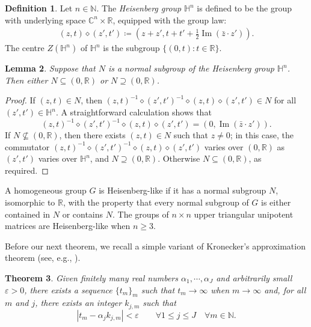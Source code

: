 \documentclass[12pt,twoside,a4paper]{amsart}
\newtheorem{thm}{Theorem}[section]
\newtheorem{lem}[thm]{Lemma}%
\theoremstyle{definition}
\newtheorem{defn}[thm]{Definition}%
\theoremstyle{remark}
\numberwithin{equation}{section}
\newcommand{\Hn}{\mathbb{H}^n}
\newcommand{\C}{\mathbb{C}}
\newcommand{\R}{\mathbb{R}}
\newcommand{\N}{\mathbb{N}}
\renewcommand{\Im}{\operatorname{Im}}
\newcommand{\lpar}{\left( }
\newcommand{\rpar}{\right) }
\newcommand{\labs}{\left\vert}
\newcommand{\rabs}{\right\vert}
\begin{document}
\begin{defn}
Let $n\in\mathbb{N}$. 
The \emph{Heisenberg group} $\Hn$ is defined to be the group with underlying space $\C^n\times\R$, equipped with the group law: 
\begin{align*}
(z,t)  \diamond  (z',t') \coloneqq  \lpar z+z', t + t' + \tfrac{1}{2} \Im(\bar z \cdot z') \rpar .
\end{align*}
The centre $Z(\Hn)$ of $\Hn$ is the subgroup $\{ (0,t) : t \in \R \}$.
\end{defn}



\begin{lem}\label{lem:kernel-homom-Heisenberg}  
Suppose that $N$ is a normal subgroup of the Heisenberg group $\Hn$.
Then either $N \subseteq (0, \R)$ or  $N \supseteq (0, \R)$.
\end{lem}

\begin{proof}
If $(z,t) \in N$, then $(z,t)^{-1} \diamond (z',t')^{-1} \diamond (z,t) \diamond (z',t') \in N$ for all $(z', t') \in \Hn$.
A straightforward calculation shows that
\[ 
(z,t)^{-1} \diamond(z',t')^{-1} \diamond  (z,t) \diamond (z' , t') = (0, \Im(\bar 
z \cdot z') ).
\]
If $N \not\subseteq (0, \R)$, then there exists $(z,t) \in N$ such that $z \neq 0$;
in this case, the commutator $(z,t)^{-1} \diamond(z',t')^{-1} \diamond  (z,t) \diamond (z',t') $ varies over $(0, \R)$ as $(z',t')$ varies over $\Hn$, and $N \supseteq (0, \R)$.
Otherwise  $N \subseteq (0, \R)$, as required.
\end{proof}

A homogeneous group $G$ is Heisenberg-like if it has a normal subgroup $N$, isomorphic to $\R$, with the property that every normal subgroup of $G$ is either contained in $N$ or contains $N$.
The groups of $n \times n$ upper triangular unipotent matrices are Heisenberg-like when $n \geq 3$.



Before our next theorem, we recall a simple variant of Kronecker's approximation theorem (see, e.g., \cite{Boh34, HW54}).

\begin{thm}\label{approKron}
Given finitely many real numbers $\alpha_1,\cdots,\alpha_J$ and arbitrarily small $\varepsilon>0$, there exists a sequence $\{t_m\}_m$ such that $t_m\to\infty$ when $m\to\infty$ and, for all $m$ and $j$, there exists an integer $k_{j,m}$ such that 
\[
\labs  { t_m}-  \alpha_j k_{j,m} \rabs <\varepsilon
\qquad\forall1\leq j\leq J \quad\forall m \in \N.
\]
\end{thm}
\end{document}
